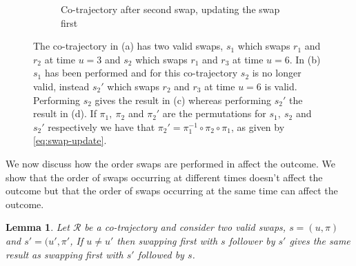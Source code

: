 \documentclass[12pt]{article}
\newcommand{\traj}{r}
\newcommand{\cotraj}{\mathcal{R}}
\newcommand{\swap}{s}
\newcommand{\swaptime}{u}
\newtheorem{lemma}{Lemma}
\theoremstyle{definition}
\begin{document}
\begin{figure}
\begin{subfigure}[t]{0.45\textwidth}
      \caption{Co-trajectory after second swap, updating the swap
        first}
      \label{fig:swap-order-d}
    \end{subfigure}
    \caption{The co-trajectory in (a) has two valid swaps,
      \(\swap_{1}\) which swaps \(\traj_{1}\) and \(\traj_{2}\) at
      time \(\swaptime = 3\) and \(\swap_{2}\) which swaps
      \(\traj_{1}\) and \(\traj_{3}\) at time \(\swaptime = 6\). In
      (b) \(\swap_{1}\) has been performed and for this co-trajectory
      \(\swap_{2}\) is no longer valid, instead \(\swap_{2}'\) which
      swaps \(\traj_{2}\) and \(\traj_{3}\) at time \(\swaptime = 6\)
      is valid. Performing \(\swap_{2}\) gives the result in (c)
      whereas performing \(\swap_{2}'\) the result in (d). If
      \(\pi_{1},\ \pi_{2}\) and \(\pi_{2}'\) are the permutations for
      \(\swap_{1},\ \swap_{2}\) and \(\swap_{2}'\) respectively we
      have that
      \(\pi_{2}' = \pi_{1}^{-1} \circ \pi_{2} \circ \pi_{1}\), as
      given by \ref{eq:swap-update}.}
    \label{fig:swap-order}
\end{figure}

We now discuss how the order swaps are performed in affect the
outcome. We show that the order of swaps occurring at different times
doesn't affect the outcome but that the order of swaps occurring at
the same time can affect the outcome.

\begin{lemma}
  \label{lemma:swap-order}
  Let \(\cotraj\) be a co-trajectory and consider two valid swaps,
  \(\swap = (\swaptime, \pi)\) and \(\swap' = (\swaptime', \pi'\), If
  \(\swaptime \not= \swaptime'\) then swapping first with \(\swap\)
  follower by \(\swap'\) gives the same result as swapping first with
  \(\swap'\) followed by \(\swap\).
\end{lemma}
\end{document}
